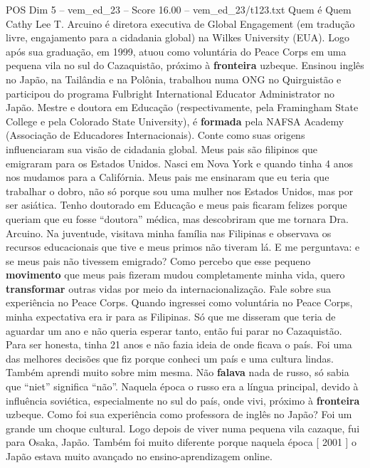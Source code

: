 \begin{textsample}{POS Dim 5 – vem\_ed\_23 – Score 16.00 – vem\_ed\_23/t123.txt}  \label{ex:f5_pos_062}
Quem é Quem Cathy Lee T.
Arcuino é diretora executiva de Global Engagement (em tradução livre, engajamento para a cidadania global) na Wilkes University (EUA).
Logo após sua graduação, em 1999, atuou como voluntária do Peace Corps em uma pequena vila no sul do Cazaquistão, próximo à \textbf{fronteira} uzbeque.
Ensinou inglês no Japão, na Tailândia e na Polônia, trabalhou numa ONG no Quirguistão e participou do programa Fulbright International Educator Administrator no Japão.
Mestre e doutora em Educação (respectivamente, pela Framingham State College e pela Colorado State University), é \textbf{formada} pela NAFSA Academy (Associação de Educadores Internacionais).
Conte como suas origens influenciaram sua visão de cidadania global.
Meus pais são filipinos que emigraram para os Estados Unidos.
Nasci em Nova York e quando tinha 4 anos nos mudamos para a Califórnia.
Meus pais me ensinaram que eu teria que trabalhar o dobro, não só porque sou uma mulher nos Estados Unidos, mas por ser asiática.
Tenho doutorado em Educação e meus pais ficaram felizes porque queriam que eu fosse “doutora” médica, mas descobriram que me tornara Dra.
Arcuino.
Na juventude, visitava minha família nas Filipinas e observava os recursos educacionais que tive e meus primos não tiveram lá.
E me perguntava: e se meus pais não tivessem emigrado?
Como percebo que esse pequeno \textbf{movimento} que meus pais fizeram mudou completamente minha vida, quero \textbf{transformar} outras vidas por meio da internacionalização.
Fale sobre sua experiência no Peace Corps.
Quando ingressei como voluntária no Peace Corps, minha expectativa era ir para as Filipinas.
Só que me disseram que teria de aguardar um ano e não queria esperar tanto, então fui parar no Cazaquistão.
Para ser honesta, tinha 21 anos e não fazia ideia de onde ficava o país.
Foi uma das melhores decisões que fiz porque conheci um país e uma cultura lindas.
Também aprendi muito sobre mim mesma.
Não \textbf{falava} nada de russo, só sabia que “niet” significa “não”.
Naquela época o russo era a língua principal, devido à influência soviética, especialmente no sul do país, onde vivi, próximo à \textbf{fronteira} uzbeque.
Como foi sua experiência como professora de inglês no Japão?
Foi um grande um choque cultural.
Logo depois de viver numa pequena vila cazaque, fui para Osaka, Japão.
Também foi muito diferente porque naquela época [ 2001 ] o Japão estava muito avançado no ensino-aprendizagem online.

\end{textsample}
